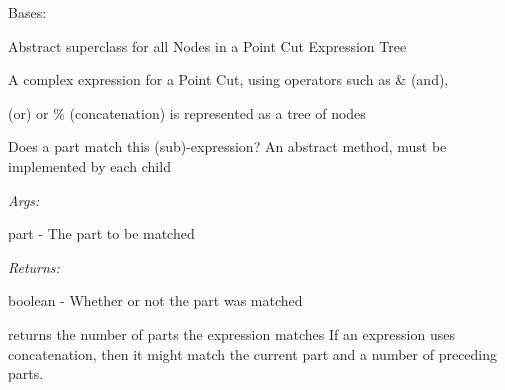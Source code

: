 \documentclass[letterpaper,10pt,english]{sphinxmanual}
\begin{document}
\begin{fulllineitems}
\label{modules/index:aosb.core.PointCutExpressionNode}
Bases: 

Abstract superclass for all Nodes in a Point Cut Expression Tree

\begin{DUlineblock}{0em}
\item[] A complex expression for a Point Cut, using operators such as \& (and),
\item[] \textbar{}  (or) or \% (concatenation) is represented as a tree of nodes
\end{DUlineblock}

\begin{fulllineitems}
\label{modules/index:aosb.core.PointCutExpressionNode.match}
Does a part match this (sub)-expression? An abstract method, must be implemented by each child

\begin{DUlineblock}{0em}
\item[] \emph{Args:}
\item[]
\begin{DUlineblock}{\DUlineblockindent}
\item[] part - The part to be matched
\end{DUlineblock}
\end{DUlineblock}

\begin{DUlineblock}{0em}
\item[] \emph{Returns:}
\item[]
\begin{DUlineblock}{\DUlineblockindent}
\item[] boolean - Whether or not the part was matched
\end{DUlineblock}
\end{DUlineblock}

\end{fulllineitems}


\begin{fulllineitems}
\label{modules/index:aosb.core.PointCutExpressionNode.numberOfMatchingParts}
returns the number of parts the expression matches
\textbar{} If an expression uses concatenation, then it might match the current part and a number of preceding parts.


\end{fulllineitems}
\end{fulllineitems}
\end{document}

